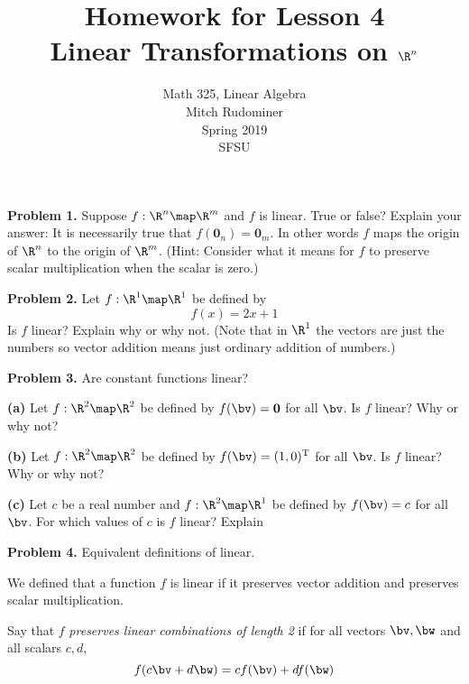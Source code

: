 \documentclass[oneside,12pt]{amsart}
\begin{document}
\title{Homework for Lesson 4 \\ Linear Transformations on $\R^n$}
\author{Math 325, Linear Algebra \\ Mitch Rudominer \\ Spring 2019 \\ SFSU }
\date{}

\maketitle


\textbf{Problem 1.} Suppose $f:\R^n\map\R^m$ and $f$ is linear.
True or false? Explain your answer:
It is necessarily true that $f(\mathbf{0}_n) = \mathbf{0}_m$.
In other words $f$ maps the origin of $\R^n$ to the origin of $\R^m$.
(Hint: Consider what it means for $f$ to preserve scalar multiplication when
the scalar is zero.)

\bigskip
\bigskip

\textbf{Problem 2.} Let $f:\R^1\map\R^1$ be defined by
$$f(x) = 2x+1$$
Is $f$ linear? Explain why or why not. (Note that in $\R^1$ the vectors are
just the numbers so vector addition means just ordinary addition of numbers.)

\bigskip
\bigskip

\textbf{Problem 3.} Are constant functions linear?

\smallskip

\textbf{(a)} Let $f:\R^{2}\map\R^2$ be defined by $f(\bv) = \textbf{0}$ for
all $\bv$. Is $f$ linear? Why or why not?

\bigskip
\bigskip

\textbf{(b)} Let $f:\R^{2}\map\R^2$ be defined by $f(\bv) = (1,0)^{\text{T}}$ for
all $\bv$. Is $f$ linear? Why or why not?

\bigskip
\bigskip

\textbf{(c)} Let $c$ be a real number and
$f:\R^{2}\map\R^1$ be defined by $f(\bv) = c$ for
all $\bv$. For which values of $c$ is $f$ linear? Explain

\bigskip
\bigskip

\textbf{Problem 4.} Equivalent definitions of linear.

\smallskip

We defined
that a function $f$ is linear if it preserves vector addition and
preserves scalar multiplication.

\smallskip

Say that $f$ \emph{preserves linear combinations of length 2}
if for all vectors $\bv, \bw$ and all scalars $c, d$,
$$f(c\bv + d\bw) = c f(\bv) + d f (\bw)$$
\end{document}

